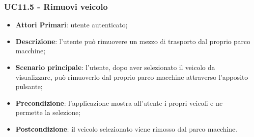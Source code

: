 \subsubsection{UC11.5 - Rimuovi veicolo}
\begin{itemize}
	\item \textbf{Attori Primari}: utente autenticato;
	\item \textbf{Descrizione}: l'utente può rimuovere un mezzo di trasporto dal proprio parco macchine;
	\item \textbf{Scenario principale}: l'utente, dopo aver selezionato il veicolo da visualizzare, può rimuoverlo dal proprio parco macchine attraverso l'apposito pulsante;
	\item \textbf{Precondizione}: l'applicazione mostra all'utente i propri veicoli e ne permette la selezione;
	\item \textbf{Postcondizione}: il veicolo selezionato viene rimosso dal parco macchine.
\end{itemize}
